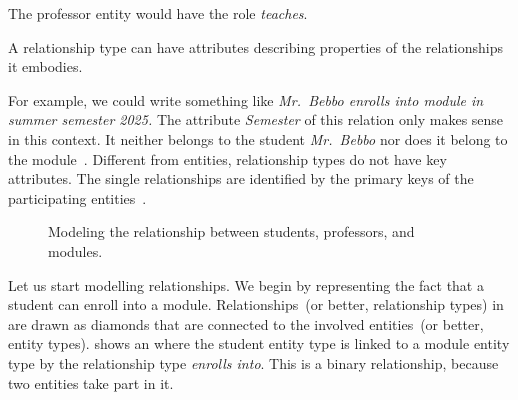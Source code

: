 The professor entity would  have the role \emph{teaches}.%
%
\begin{definition}%
\label{def:relationshipAttribute}%
A relationship type can have attributes describing properties of the relationships it embodies.%
\end{definition}%
%
For example, we could write something like \emph{Mr.~Bebbo enrolls into module  in summer semester 2025.}
The attribute \emph{Semester} of this relation only makes sense in this context.
It neither belongs to the student \emph{Mr.~Bebbo} nor does it belong to the module~\emph{}.
Different from entities, relationship types do not have key attributes.
The single relationships are identified by the primary keys of the participating entities~\cite{G2011EW2ITDS:CMUTERM}.

\begin{figure}%
\centering%
%
%
%
\floatRowSep%
%
%
%
\floatRowSep%
%
%
%
\floatRowSep%
%
\xdef\erdStudentModuleProfIII{\currentDir/erdStudentModuleProf3}%
%
%
\caption{Modeling the relationship between students, professors, and modules.}%
\label{fig:erdStudentModuleProf}%
%
\end{figure}%
%
Let us start modelling relationships.
We begin by representing the fact that a student can enroll into a module.
Relationships~(or better, relationship types) in  are drawn as diamonds that are connected to the involved entities~(or better, entity types).
 shows an  where the student entity type is linked to a module entity type by the relationship type \emph{enrolls into}.
This is a binary relationship, because two entities take part in it.

